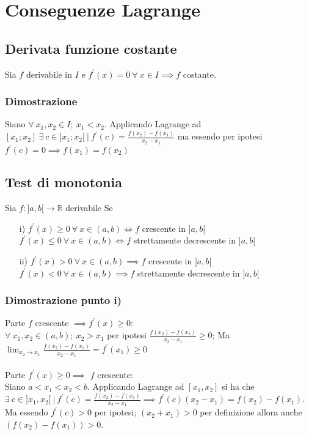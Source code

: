 \section{Conseguenze Lagrange}
\subsection{Derivata funzione costante}
Sia $f$ derivabile in $I$ e $f^{\prime}(x) = 0\ \forall\ x \in I \implies f$ costante.
\subsubsection{Dimostrazione}
Siano $\forall\ x_1, x_2 \in I;\ x_1 < x_2$. Applicando Lagrange ad $[x_1;x_2]\ \exists\ c \in ]x_1;x_2[\ |\ f^{\prime}(c) = \frac{f(x_2) - f(x_1)}{x_2 - x_1}$ ma essendo per ipotesi $f^{\prime}(c) = 0 \implies f(x_1) = f(x_2)$

\subsection{Test di monotonia}
Sia $f:]a,b[ \to \mathbb{R}$ derivabile Se
\begin{enumerate}
\item[i)] $f^{\prime}(x) \geq 0\ \forall\ x \in (a,b) \iff f$ crescente in $]a,b[$\\
$f^{\prime}(x) \leq 0\ \forall\ x \in (a,b) \iff f$ strettamente decrescente in $]a,b[$
\item[ii)] $f^{\prime}(x) > 0\ \forall\ x \in (a,b) \implies f$ crescente in $]a,b[$\\
$f^{\prime}(x) < 0\ \forall\ x \in (a,b) \implies f$ strettamente decrescente in $]a,b[$
\end{enumerate}

\subsubsection{Dimostrazione punto i)}
Parte $f$ crescente $\implies f^{\prime}(x) \geq 0$:\\
$\forall\ x_1,x_2 \in (a,b);\ x_2>x_1$ per ipotesi $\frac{f(x_2) - f(x_1)}{x_2 - x_1} \geq 0$; Ma $\displaystyle \lim_{x_2 \to x_1}\frac{f(x_2) - f(x_1)}{x_2 - x_1} = f^{\prime}(x_1) \geq 0$\\
\\
Parte  $f^{\prime}(x) \geq 0 \implies$ $f$ crescente:\\ 
Siano $a < x_1 < x_2 < b$. Applicando Lagrange ad $[x_1,x_2]$ si ha che $\exists\ c \in ]x_1,x_2[\ |\ f^{\prime}(c) = \frac{f(x_2) - f(x_1)}{x_2 - x_1} \implies f^{\prime}(c)(x_2- x_1) = f(x_2) - f(x_1)$. Ma essendo $f^{\prime}(c) > 0$ per ipotesi; $(x_2 + x_1) > 0$ per definizione allora anche $(f(x_2) - f(x_1)) > 0$.

